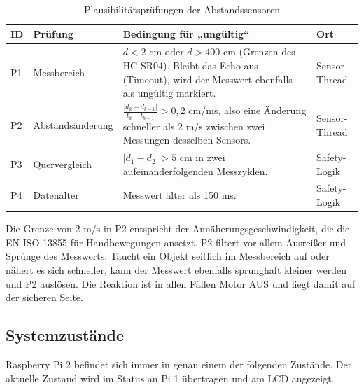 \begin{table}[H]
    \centering
    \small
    \begin{tabularx}{\textwidth}{@{}p{0.7cm}p{3.1cm}Yp{2.3cm}@{}}
        \toprule
        \textbf{ID} & \textbf{Prüfung} & \textbf{Bedingung für „ungültig“} & \textbf{Ort} \\
        \midrule
        P1 & Messbereich & $d < 2$ cm oder $d > 400$ cm (Grenzen des HC-SR04). Bleibt das Echo aus (Timeout), wird der Messwert ebenfalls als ungültig markiert. & Sensor-Thread \\
        P2 & Abstandsänderung & $\frac{|d_k - d_{k-1}|}{t_k - t_{k-1}} > 0{,}2$ cm/ms, also eine Änderung schneller als 2 m/s zwischen zwei Messungen desselben Sensors. & Sensor-Thread \\
        P3 & Quervergleich & $|d_1 - d_2| > 5$ cm in zwei aufeinanderfolgenden Messzyklen. & Safety-Logik \\
        P4 & Datenalter & Messwert älter als 150 ms. & Safety-Logik \\
        \bottomrule
    \end{tabularx}
    \caption{Plausibilitätsprüfungen der Abstandssensoren}
\end{table}

Die Grenze von 2 m/s in P2 entspricht der Annäherungsgeschwindigkeit, die die
EN ISO 13855 für Handbewegungen ansetzt. P2 filtert vor allem Ausreißer und
Sprünge des Messwerts. Taucht ein Objekt seitlich im Messbereich auf oder nähert
es sich schneller, kann der Messwert ebenfalls sprunghaft kleiner werden und P2
auslösen. Die Reaktion ist in allen Fällen Motor AUS und liegt damit auf der
sicheren Seite.

\subsection{Systemzustände}
\label{sec:states}

Raspberry Pi 2 befindet sich immer in genau einem der folgenden Zustände. Der
aktuelle Zustand wird im Status an Pi 1 übertragen und am LCD angezeigt.

